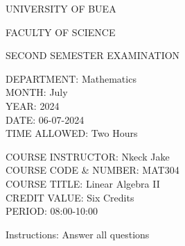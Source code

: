 \documentclass[a4paper]{book}
\begin{document}
\begin{center}
UNIVERSITY OF BUEA
\end{center}
\begin{center}
FACULTY OF SCIENCE
\end{center}
\begin{center}
SECOND SEMESTER EXAMINATION
\end{center}
\begin{flushleft}
DEPARTMENT: Mathematics\\
MONTH: July\\
YEAR: 2024\\
DATE: 06-07-2024\\
TIME ALLOWED: Two Hours\\
\end{flushleft}
\begin{flushright}
COURSE INSTRUCTOR: Nkeck Jake\\
COURSE CODE \& NUMBER: MAT304\\
COURSE TITLE: Linear Algebra II\\
CREDIT VALUE: Six Credits\\
PERIOD: 08:00-10:00\\
\end{flushright}
\begin{center}
Instructions: Answer all questions
\end{center}
\end{document}
